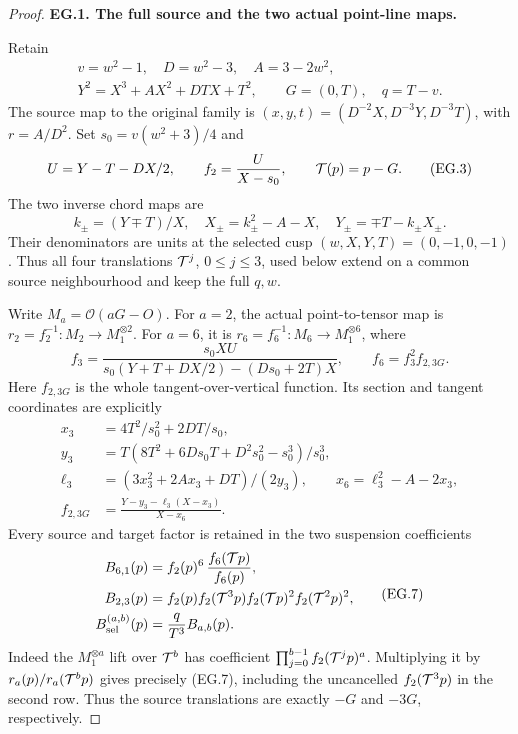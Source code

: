 \begin{proof}
\par\medskip\noindent\textbf{EG.1. The full source and the two actual point-line maps.}\par\nopagebreak[4]

Retain
\[
 \begin{gathered}
 v=w^2-1,\quad D=w^2-3,\quad A=3-2w^2,\quad
 \\
 Y^2=X^3+AX^2+DTX+T^2,\qquad G=(0,T),\quad q=T-v .
 \end{gathered}
 \tag{EG.2}
\]
The source map to the original family is
\((x,y,t)=(D^{-2}X,D^{-3}Y,D^{-3}T)\), with
\(r=A/D^2\). Set \(s_0=v(w^2+3)/4\) and
\[
 U=Y-T-DX/2,\qquad
 f_2=\frac{U}{X-s_0},\qquad {\cal T}(p)=p-G .
 \tag{EG.3}
\]
The two inverse chord maps are
\[
 k_\pm=(Y\mp T)/X,\quad
 X_\pm=k_\pm^2-A-X,\quad Y_\pm=\mp T-k_\pm X_\pm .
 \tag{EG.4}
\]
Their denominators are units at the selected cusp
\((w,X,Y,T)=(0,-1,0,-1)\). Thus all four translations
\({\cal T}^j\), \(0\le j\le3\), used below extend on a common
source neighbourhood and keep the full \(q,w\).

Write \(M_a=\mathcal O(aG-O)\). For \(a=2\), the actual
point-to-tensor map is \(r_2=f_2^{-1}:M_2\to M_1^{\otimes2}\).
For \(a=6\), it is \(r_6=f_6^{-1}:M_6\to M_1^{\otimes6}\), where
\[
 f_3=\frac{s_0XU}{s_0(Y+T+DX/2)-(Ds_0+2T)X},
 \qquad f_6=f_3^2 f_{2,3G}.
 \tag{EG.5}
\]
Here \(f_{2,3G}\) is the whole tangent-over-vertical function.
Its section and tangent coordinates are explicitly
\[
 \begin{split}
 x_3&=4T^2/s_0^2+2DT/s_0,\\
 y_3&=T(8T^2+6Ds_0T+D^2s_0^2-s_0^3)/s_0^3,\\
 \ell_3&=(3x_3^2+2Ax_3+DT)/(2y_3),\qquad
 x_6=\ell_3^2-A-2x_3,\\
 f_{2,3G}&=\frac{Y-y_3-\ell_3(X-x_3)}{X-x_6}.
 \end{split}
 \tag{EG.6}
\]
Every source and target factor is retained in the two suspension
coefficients
\[
 \begin{split}
 B_{6,1}(p)&=f_2(p)^6\,\frac{f_6({\cal T}p)}{f_6(p)},\\
 B_{2,3}(p)&=f_2(p)f_2({\cal T}^3p)
                     f_2({\cal T}p)^2f_2({\cal T}^2p)^2,\\
 B_{\rm sel}^{(a,b)}(p)&=\frac q{T^3}B_{a,b}(p).
 \end{split}
 \tag{EG.7}
\]
Indeed the \(M_1^{\otimes a}\) lift over \({\cal T}^b\)
has coefficient \(\prod_{j=0}^{b-1}f_2({\cal T}^jp)^a\).
Multiplying it by \(r_a(p)/r_a({\cal T}^bp)\) gives precisely
(EG.7), including the uncancelled \(f_2({\cal T}^3p)\) in the
second row. Thus the source translations are exactly \(-G\)
and \(-3G\), respectively.


\end{proof}
